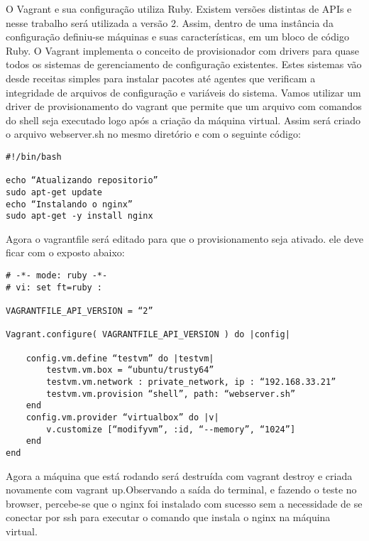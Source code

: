 O Vagrant e sua configuração utiliza Ruby. Existem 
versões distintas de APIs e nesse trabalho será utilizada 
a versão 2. Assim, dentro de uma instância da configuração 
definiu-se máquinas e suas características, em um bloco de 
código Ruby.
O Vagrant implementa o conceito de provisionador com 
drivers para quase todos os sistemas de gerenciamento de 
configuração existentes. Estes sistemas vão desde receitas 
simples para instalar pacotes até agentes que verificam a 
integridade de arquivos de configuração e variáveis do 
sistema. Vamos utilizar um driver de provisionamento do 
vagrant que permite que um arquivo com comandos do shell 
seja executado logo após a criação da máquina virtual. 
Assim será criado o arquivo webserver.sh no mesmo diretório 
e com o seguinte código: 
\begin{lstlisting}
#!/bin/bash

echo “Atualizando repositorio”
sudo apt-get update
echo “Instalando o nginx”
sudo apt-get -y install nginx
\end{lstlisting}
Agora o vagrantfile será editado para que o provisionamento 
seja ativado. ele deve ficar com o exposto abaixo:
\begin{lstlisting}
# -*- mode: ruby -*-
# vi: set ft=ruby :

VAGRANTFILE_API_VERSION = “2”

Vagrant.configure( VAGRANTFILE_API_VERSION ) do |config|

	config.vm.define “testvm” do |testvm|
		testvm.vm.box = “ubuntu/trusty64”
		testvm.vm.network : private_network, ip : “192.168.33.21”
		testvm.vm.provision “shell”, path: “webserver.sh”
	end
	config.vm.provider “virtualbox” do |v|
		v.customize [“modifyvm”, :id, “--memory”, “1024”]
	end
end
\end{lstlisting}
Agora a máquina que está rodando será 
destruída com vagrant destroy e criada novamente com 
vagrant up.Observando a saída do terminal, e fazendo 
o teste no browser, percebe-se que o nginx foi 
instalado com sucesso sem a necessidade de se conectar 
por ssh para executar o comando que instala o nginx na 
máquina virtual.


